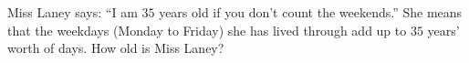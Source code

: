 Miss Laney says: ``I am $35$ years old if you don't count the weekends.'' She means that the weekdays (Monday to Friday) she has lived through add up to $35$ years' worth of days. How old is Miss Laney?

